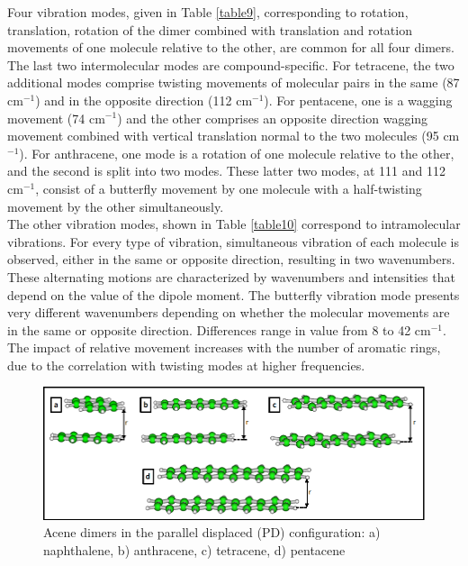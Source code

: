 Four vibration modes, given in Table \ref{table9}, corresponding to rotation, translation, rotation of the dimer combined with translation and rotation movements of one molecule relative to the other, are common for all four dimers. The last two intermolecular modes are compound-specific. For tetracene, the two additional modes comprise twisting movements of molecular pairs in the same (87 cm$^{-1}$) and in the opposite direction (112 cm$^{-1}$). For pentacene, one is a wagging movement (74 cm$^{-1}$) and the other comprises an opposite direction wagging movement combined with vertical translation normal to the two molecules (95 cm$^{-1}$). For anthracene, one mode is a rotation of one molecule relative to the other, and the second is split into two modes. These latter two modes, at 111 and 112 cm$^{-1}$, consist of a butterfly movement by one molecule with a half-twisting movement by the other simultaneously.\\

The other vibration modes, shown in Table \ref{table10} correspond to intramolecular vibrations. For every type of vibration, simultaneous vibration of each molecule is observed, either in the same or opposite direction, resulting in two wavenumbers. These alternating motions are characterized by wavenumbers and intensities that depend on the value of the dipole moment. The butterfly vibration mode presents very different wavenumbers depending on whether the molecular movements are in the same or opposite direction. Differences range in value from 8 to 42 cm$^{-1}$. The impact of relative movement increases with the number of aromatic rings, due to the correlation with twisting modes at higher frequencies. 

\begin{figure}[H]
	\centering
	\includegraphics[scale=0.55]{image/acene-dimers}    
	\caption[Acene dimers in the parallel displaced configuration]{Acene dimers in the parallel displaced (PD) configuration: a) naphthalene, b) anthracene, c) tetracene, d) pentacene}  \label{figure6}
\end{figure}


